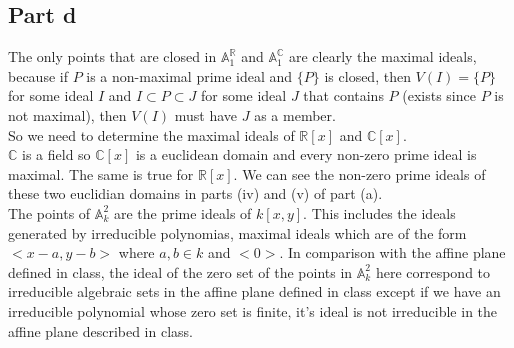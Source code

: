 \documentclass[12pt]{article}
\begin{document}
\subsection*{Part d}
The only points that are closed in $\mathbb{A}_1^{\mathbb{R}}$ and $\mathbb{A}_1^{\mathbb{C}}$ are clearly the maximal ideals, because if $P$ is a non-maximal prime ideal and $\{P\}$ is closed, then $V(I)=\{P\}$ for some ideal $I$ and $I \subset P \subset J$ for some ideal $J$ that contains $P$ (exists since $P$ is not maximal), then $V(I)$ must have $J$ as a member. \\
So we need to determine the maximal ideals of $\mathbb{R}[x]$ and $\mathbb{C}[x]$. \\
$\mathbb{C}$ is a field so $\mathbb{C}[x]$ is a euclidean domain and every non-zero prime ideal is maximal. The same is true for 
$\mathbb{R}[x]$. We can see the non-zero prime ideals of these two euclidian domains in parts
(iv) and (v) of part (a). \\
The points of $\mathbb{A}_k^2$ are the prime ideals of $k[x,y]$. This includes the ideals generated by irreducible polynomias, maximal ideals which are of the form $<x-a,y-b>$ where $a,b \in k$ and $<0>$. In comparison with the affine plane defined in class, the ideal of the zero set of the points in $\mathbb{A}_k^2$ here correspond to irreducible algebraic sets in the affine plane defined in class except if we have an irreducible polynomial whose zero set is finite, it's ideal is not irreducible in the affine plane described in class.
\end{document}
